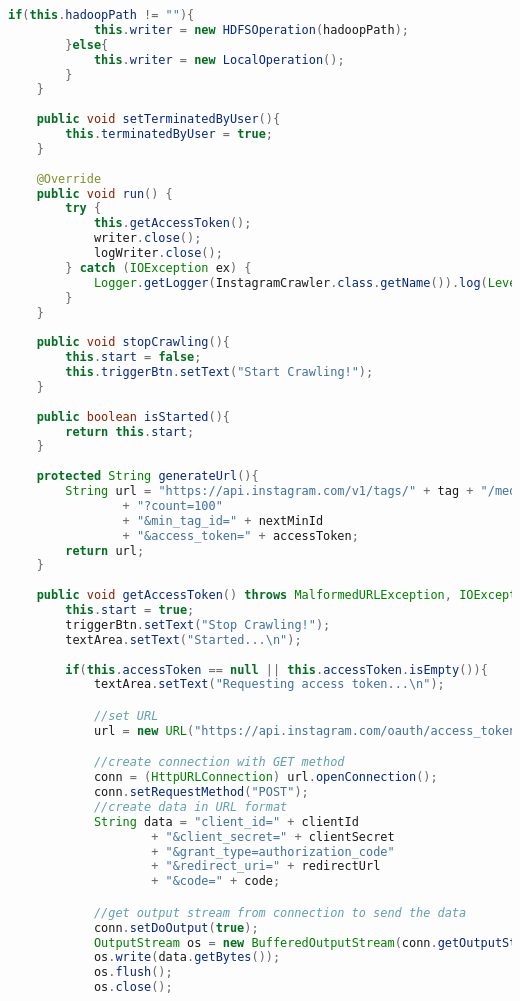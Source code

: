 \begin{lstlisting}[language=Java,basicstyle=\tiny,caption=InstagramCrawler.java]
        if(this.hadoopPath != ""){
            this.writer = new HDFSOperation(hadoopPath);
        }else{
            this.writer = new LocalOperation();
        }
    }
    
    public void setTerminatedByUser(){
        this.terminatedByUser = true;
    }
    
    @Override
    public void run() {
        try {
            this.getAccessToken();
            writer.close();
            logWriter.close();
        } catch (IOException ex) {
            Logger.getLogger(InstagramCrawler.class.getName()).log(Level.SEVERE, null, ex);
        }
    }
    
    public void stopCrawling(){
        this.start = false;
        this.triggerBtn.setText("Start Crawling!");
    }
    
    public boolean isStarted(){
        return this.start;
    }
    
    protected String generateUrl(){
        String url = "https://api.instagram.com/v1/tags/" + tag + "/media/recent"
                + "?count=100"
                + "&min_tag_id=" + nextMinId
                + "&access_token=" + accessToken;
        return url;
    }
    
    public void getAccessToken() throws MalformedURLException, IOException{
        this.start = true;
        triggerBtn.setText("Stop Crawling!");
        textArea.setText("Started...\n");
        
        if(this.accessToken == null || this.accessToken.isEmpty()){
            textArea.setText("Requesting access token...\n");

            //set URL
            url = new URL("https://api.instagram.com/oauth/access_token");

            //create connection with GET method
            conn = (HttpURLConnection) url.openConnection();
            conn.setRequestMethod("POST");
            //create data in URL format
            String data = "client_id=" + clientId
                    + "&client_secret=" + clientSecret
                    + "&grant_type=authorization_code"
                    + "&redirect_uri=" + redirectUrl
                    + "&code=" + code;

            //get output stream from connection to send the data
            conn.setDoOutput(true);
            OutputStream os = new BufferedOutputStream(conn.getOutputStream());
            os.write(data.getBytes());
            os.flush();
            os.close();


\end{lstlisting}
